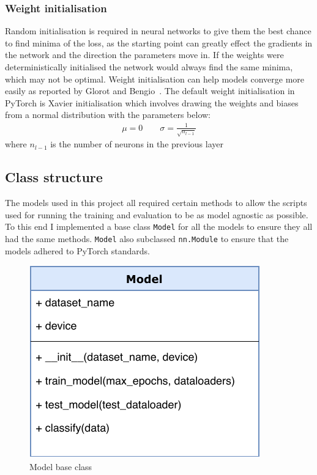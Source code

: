 \subsubsection{Weight initialisation}
Random initialisation is required in neural networks to give them the best chance to find minima of the loss, as the starting 
point can greatly effect the gradients in the network and the direction the parameters move in. If the weights were 
deterministically initialised the network would always find the same minima, which may not be optimal.
Weight initialisation can help models converge more easily as reported by Glorot and Bengio~\cite{DBLP:journals/jmlr/GlorotB10}.
The default weight initialisation in PyTorch is Xavier initialisation which involves drawing the weights and biases from a normal 
distribution with the parameters below:
\begin{align*}
  \mu = 0 \qquad \sigma = \frac{1}{\sqrt{n_{l-1}}}
\end{align*}
where $n_{l-1}$ is the number of neurons in the previous layer

\subsection{Class structure}

The models used in this project all required certain methods to allow the scripts used for running the training and evaluation to be as 
model agnostic as possible. To this end I implemented a base class \texttt{Model} for all the models to ensure they all had the same methods.
\texttt{Model} also subclassed \texttt{nn.Module} to ensure that the models adhered to PyTorch standards.
\begin{figure}[H]
  \centering
  \includegraphics[scale=1]{figs/model_class.pdf}
  \caption{Model base class}
\end{figure}

